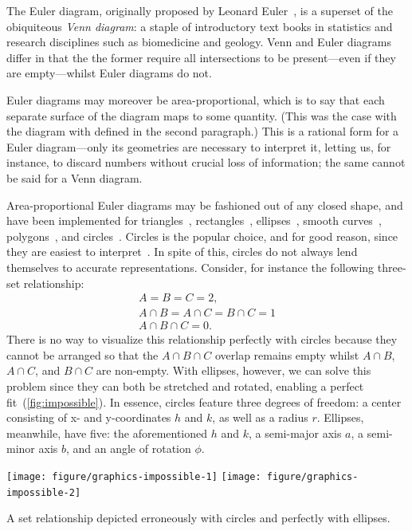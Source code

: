 \documentclass[
  oneside,
  openany,
  numbers=noendperiod,
  parskip=half,
  bibliography=totoc
]{scrbook}\usepackage[]{graphicx}\usepackage{xcolor}
\newenvironment{knitrout}{}{} %
\begin{document}
The Euler diagram, originally proposed by Leonard Euler~\citep{euler_1802}, is
a superset of the obiquiteous \emph{Venn diagram}: a staple of introductory
text books in statistics and research disciplines such as biomedicine and
geology. Venn and Euler diagrams differ in that the the former require all
intersections to be present---even if they are empty---whilst Euler diagrams do
not.

Euler diagrams may moreover be area-proportional, which is to say that each separate
surface of the diagram maps to some quantity. (This was the case with
the diagram with defined in the second paragraph.) This is a rational form for a
Euler diagram---only its geometries are necessary to interpret it, letting us, for
instance, to discard numbers without crucial loss of information; the same
cannot be said for a Venn diagram.

Area-proportional Euler diagrams may be fashioned out of any closed shape, and
have been implemented for triangles~\citep{swinton_2011},
rectangles~\citep{swinton_2011}, ellipses~\citep{micallef_2014}, smooth
curves~\citep{micallef_2014b}, polygons~\citep{swinton_2011}, and
circles~\citep{wilkinson_2012,kestler_2008,swinton_2011}. Circles is the
popular choice, and for good reason, since they are easiest to
interpret~\citep{blake_2016}. In spite of this, circles do not always lend
themselves to accurate representations. Consider, for instance the following
three-set relationship:
\[
\begin{gathered}
A = B = C = 2,\\
A \cap B = A \cap C = B \cap C = 1\\
A \cap B \cap C = 0.
\end{gathered}
\]
There is no way to visualize this relationship perfectly with circles because
they cannot be arranged so that the $A \cap B \cap C$ overlap remains empty whilst
$A \cap B$, $A \cap C$, and $B \cap C$ are non-empty. With ellipses, however,
we can solve this problem since they can both be stretched and rotated, enabling
a perfect fit~(\cref{fig:impossible}). In essence, circles
feature three degrees of freedom: a center consisting of x- and
y-coordinates $h$ and $k$, as well as a radius $r$. Ellipses, meanwhile, have
five: the aforementioned $h$ and $k$, a semi-major axis $a$, a semi-minor axis
$b$, and an angle of rotation $\phi$.

\begin{marginfigure}
\begin{knitrout}\small
{}\color{fgcolor}

{\centering \texttt{[image: figure/graphics-impossible-1]} 
\texttt{[image: figure/graphics-impossible-2]} 

}



\end{knitrout}
\caption{A set relationship depicted erroneously with circles and perfectly with
  ellipses.}
\label{fig:impossible}
\end{marginfigure}
\end{document}
